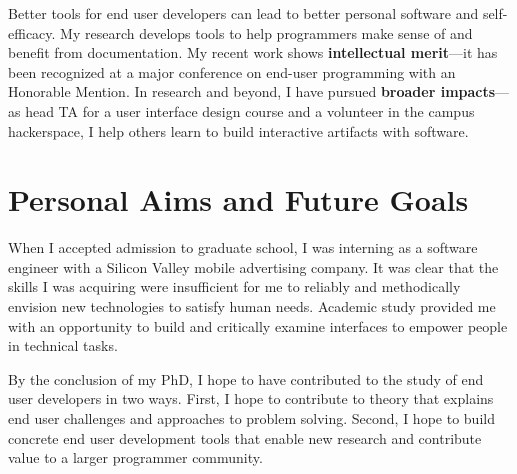 \documentclass[12pt]{memoir}
\title{}
\author{Andrew Head}
\begin{document}


Better tools for end user developers can lead to better personal software and self-efficacy.
My research develops tools to help programmers make sense of and benefit from documentation.
My recent work shows \textbf{intellectual merit}---it has been recognized at a major conference on end-user programming with an Honorable Mention.
In research and beyond, I have pursued \textbf{broader impacts}---as head TA for a user interface design course and a volunteer in the campus hackerspace, I help others learn to build interactive artifacts with software.

\section{Personal Aims and Future Goals}

When I accepted admission to graduate school, I was interning as a software engineer with a Silicon Valley mobile advertising company.
It was clear that the skills I was acquiring were insufficient for me to reliably and methodically envision new technologies to satisfy human needs.
Academic study provided me with an opportunity to build and critically examine interfaces to empower people in technical tasks.

By the conclusion of my PhD, I hope to have contributed to the study of end user developers in two ways.
First, I hope to contribute to theory that explains end user challenges and approaches to problem solving.
Second, I hope to build concrete end user development tools that enable new research and contribute value to a larger programmer community.

\end{document}
